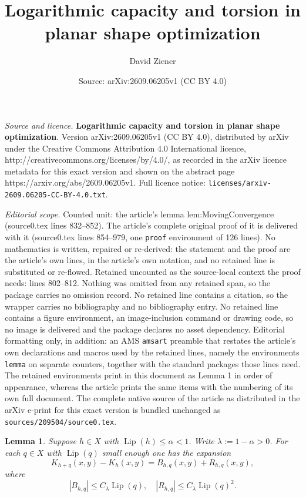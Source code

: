 \documentclass[10pt,a4paper]{amsart}
\title{\textbf{Logarithmic capacity and torsion in planar shape optimization}}
\author{David Ziener}
\date{Source: arXiv:2609.06205v1 (CC BY 4.0)}
\newtheorem{lemma}{Lemma}
\DeclareMathOperator{\Lip}{Lip}
\begin{document}
\maketitle

\noindent\emph{Source and licence.} \textbf{Logarithmic capacity and torsion in planar shape optimization}. Version arXiv:2609.06205v1 (CC BY 4.0), distributed by arXiv under the Creative Commons Attribution 4.0 International licence, http://creativecommons.org/licenses/by/4.0/, as recorded in the arXiv licence metadata for this exact version and shown on the abstract page https://arxiv.org/abs/2609.06205v1. Full licence notice: \texttt{licenses/arxiv-2609.06205-CC-BY-4.0.txt}.\par\smallskip

\noindent\textit{Editorial scope.} Counted unit: the article's lemma lem:MovingConvergence (source0.tex lines 832--852). The article's complete original proof of it is delivered with it (source0.tex lines 854--979, one \texttt{proof} environment of 126 lines). No mathematics is written, repaired or re-derived: the statement and the proof are the article's own lines, in the article's own notation, and no retained line is substituted or re-flowed.  Retained uncounted as the source-local context the proof needs: lines 802--812.  Nothing was omitted from any retained span, so the package carries no omission record.  No retained line contains a citation, so the wrapper carries no bibliography and no bibliography entry.  No retained line contains a figure environment, an image-inclusion command or drawing code, so no image is delivered and the package declares no asset dependency.  Editorial formatting only, in addition: an AMS \texttt{amsart} preamble that restates the article's own declarations and macros used by the retained lines, namely the environments \texttt{lemma} on separate counters, together with the standard packages those lines need.  The retained environments print in this document as Lemma 1 in order of appearance, whereas the article prints the same items with the numbering of its own full document.  The complete native source of the article as distributed in the arXiv e-print for this exact version is bundled unchanged as \texttt{sources/209504/source0.tex}.
    \begin{lemma}
        \label{lem:KernelExpansion}
        Suppose $h \in X$ with $\Lip(h)\leq \alpha <1$. Write $\lambda:=1-\alpha >0$. For each $q \in X$ with $\Lip(q)$ small enough one has the expansion
        \[
        K_{h+q}(x,y)-K_h(x,y)=B_{h,q}(x,y)+R_{h,q}(x,y),
        \]
        where
        \[
        |B_{h,q}|\leq C_\lambda \Lip(q),\quad |R_{h,q}|\leq C_\lambda\Lip(q)^2.
        \]
    \end{lemma}
\end{document}
